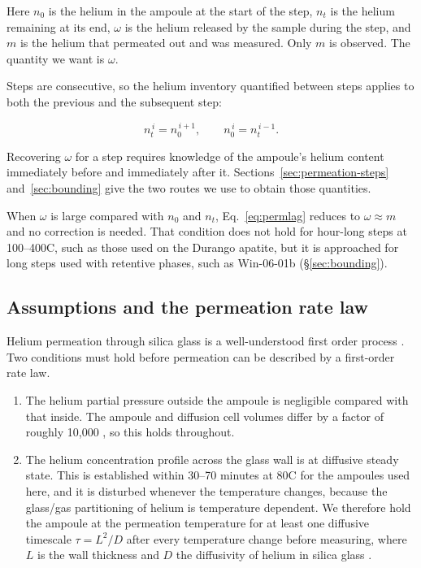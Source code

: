 Here $n_{0}$ is the helium in the ampoule at the start of the step, $n_{t}$ is the helium remaining at its end, $\omega$ is the helium released by the sample during the step, and $m$ is the helium that permeated out and was measured. Only $m$ is observed. The quantity we want is $\omega$.

Steps are consecutive, so the helium inventory quantified between steps applies to both the previous and the subsequent step:

\begin{equation}
\label{eq:carry}
n_{t}^{\,i} = n_{0}^{\,i+1}, \qquad n_{0}^{\,i} = n_{t}^{\,i-1} .
\end{equation}

Recovering $\omega$ for a step requires knowledge of the ampoule's helium content immediately before and immediately after it. Sections~\ref{sec:permeation-steps} and~\ref{sec:bounding} give the two routes we use to obtain those quantities.

When $\omega$ is large compared with $n_{0}$ and $n_{t}$, Eq.~\eqref{eq:permlag} reduces to $\omega \approx m$ and no correction is needed. That condition does not hold for hour-long steps at 100--400\textdegree C, such as those used on the Durango apatite, but it is approached for long steps used with retentive phases, such as Win-06-01b (\S\ref{sec:bounding}).

\subsection{Assumptions and the permeation rate law}\label{sec:assumptions}

Helium permeation through silica glass is a well-understood first order process \citep{norton1953,altemose1961,swets1961,masaryk1968}. Two conditions must hold before permeation can be described by a first-order rate law.

\begin{enumerate}
\item The helium partial pressure outside the ampoule is negligible compared with that inside. The ampoule and diffusion cell volumes differ by a factor of roughly 10,000 \citep{farley1999}, so this holds throughout.
\item The helium concentration profile across the glass wall is at diffusive steady state. This is established within 30--70 minutes at 80\textdegree C for the ampoules used here, and it is disturbed whenever the temperature changes, because the glass/gas partitioning of helium is temperature dependent. We therefore hold the ampoule at the permeation temperature for at least one diffusive timescale $\tau = L^{2}/D$ after every temperature change before measuring, where $L$ is the wall thickness and $D$ the diffusivity of helium in silica glass \citep{swets1961}.
\end{enumerate}


